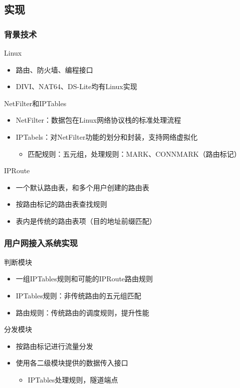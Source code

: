 \documentclass{beamer}
\begin{document}
\subsection{实现}
\begin{frame}
  \frametitle{背景技术}
  \begin{block}{Linux}
    \begin{itemize}
    \item 路由、防火墙、编程接口
    \item DIVI、NAT64、DS-Lite均有Linux实现
    \end{itemize}
  \end{block}

  \begin{block}{NetFilter和IPTables}
    \begin{itemize}
    \item NetFilter：数据包在Linux网络协议栈的标准处理流程
    \item IPTabels：对NetFilter功能的划分和封装，支持网络虚拟化
      \begin{itemize}
      \item 匹配规则：五元组，处理规则：MARK、CONNMARK（路由标记）
      \end{itemize}
    \end{itemize}
  \end{block}

  \begin{block}{IPRoute}
    \begin{itemize}
    \item 一个默认路由表，和多个用户创建的路由表
    \item 按路由标记的路由表查找规则
    \item 表内是传统的路由表项（目的地址前缀匹配）
    \end{itemize}
  \end{block}
\end{frame}

\begin{frame}
  \frametitle{用户网接入系统实现}

  \begin{block}{判断模块}
    \begin{itemize}
    \item 一组IPTables规则和可能的IPRoute路由规则
    \item IPTables规则：非传统路由的五元组匹配
    \item 路由规则：传统路由的调度规则，提升性能
    \end{itemize}
  \end{block}

  \begin{block}{分发模块}
    \begin{itemize}
    \item 按路由标记进行流量分发
    \item 使用各二级模块提供的数据传入接口
      \begin{itemize}
      \item IPTables处理规则，隧道端点
      \end{itemize}
    \end{itemize}
  \end{block}
\end{frame}
\end{document}
